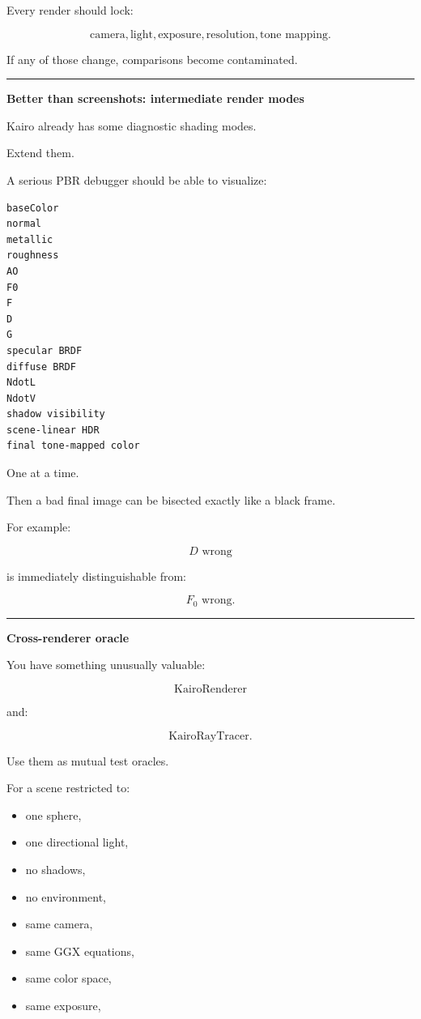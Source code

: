 Every render should lock:

\[
\text{camera},
\text{light},
\text{exposure},
\text{resolution},
\text{tone mapping}.
\]

If any of those change, comparisons become contaminated.

\begin{center}\rule{0.5\linewidth}{0.5pt}\end{center}

\textbf{Better than screenshots: intermediate render modes}

Kairo already has some diagnostic shading modes.

Extend them.

A serious PBR debugger should be able to visualize:

\begin{verbatim}
baseColor
normal
metallic
roughness
AO
F0
F
D
G
specular BRDF
diffuse BRDF
NdotL
NdotV
shadow visibility
scene-linear HDR
final tone-mapped color
\end{verbatim}

One at a time.

Then a bad final image can be bisected exactly like a black frame.

For example:

\[
D\text{ wrong}
\]

is immediately distinguishable from:

\[
F_0\text{ wrong}.
\]

\begin{center}\rule{0.5\linewidth}{0.5pt}\end{center}

\textbf{Cross-renderer oracle}

You have something unusually valuable:

\[
\text{KairoRenderer}
\]

and:

\[
\text{KairoRayTracer}.
\]

Use them as mutual test oracles.

For a scene restricted to:

\begin{itemize}
\tightlist
\item
  one sphere,
\item
  one directional light,
\item
  no shadows,
\item
  no environment,
\item
  same camera,
\item
  same GGX equations,
\item
  same color space,
\item
  same exposure,
\end{itemize}

